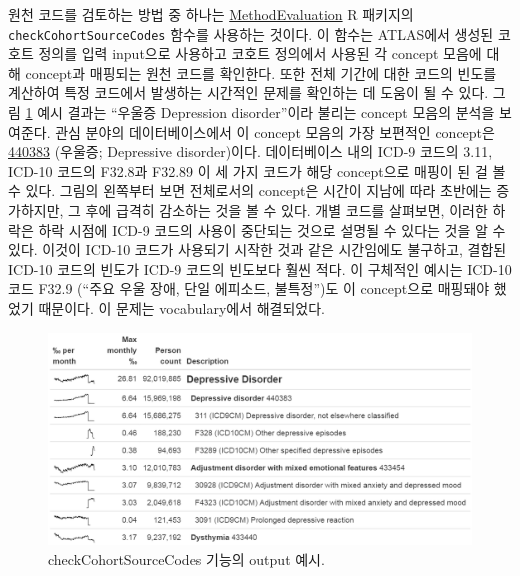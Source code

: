 \documentclass[10.5pt]{book}
\theoremstyle{definition}
\theoremstyle{definition}
\theoremstyle{definition}
\theoremstyle{remark}
\begin{document}
원천 코드를 검토하는 방법 중 하나는
\href{https://ohdsi.github.io/MethodEvaluation/}{MethodEvaluation} R
패키지의 \texttt{checkCohortSourceCodes} 함수를 사용하는 것이다. 이
함수는 ATLAS에서 생성된 코호트 정의를 입력 input으로 사용하고 코호트
정의에서 사용된 각 concept 모음에 대해 concept과 매핑되는 원천 코드를
확인한다. 또한 전체 기간에 대한 코드의 빈도를 계산하여 특정 코드에서
발생하는 시간적인 문제를 확인하는 데 도움이 될 수 있다. 그림
\ref{fig:sourceCodes} 예시 결과는 ``우울증 Depression disorder''이라
불리는 concept 모음의 분석을 보여준다. 관심 분야의 데이터베이스에서 이
concept 모음의 가장 보편적인 concept은
\href{http://athena.ohdsi.org/search-terms/terms/440383}{440383}
(우울증; Depressive disorder)이다. 데이터베이스 내의 ICD-9 코드의 3.11,
ICD-10 코드의 F32.8과 F32.89 이 세 가지 코드가 해당 concept으로 매핑이
된 걸 볼 수 있다. 그림의 왼쪽부터 보면 전체로서의 concept은 시간이
지남에 따라 초반에는 증가하지만, 그 후에 급격히 감소하는 것을 볼 수
있다. 개별 코드를 살펴보면, 이러한 하락은 하락 시점에 ICD-9 코드의
사용이 중단되는 것으로 설명될 수 있다는 것을 알 수 있다. 이것이 ICD-10
코드가 사용되기 시작한 것과 같은 시간임에도 불구하고, 결합된 ICD-10
코드의 빈도가 ICD-9 코드의 빈도보다 훨씬 적다. 이 구체적인 예시는 ICD-10
코드 F32.9 (``주요 우울 장애, 단일 에피소드, 불특정'')도 이 concept으로
매핑돼야 했었기 때문이다. 이 문제는 vocabulary에서 해결되었다.

\begin{figure}

{\centering \includegraphics[width=1\linewidth]{images/DataQuality/sourceCodes} 

}

\caption{checkCohortSourceCodes 기능의 output 예시. }\label{fig:sourceCodes}
\end{figure}
\end{document}
